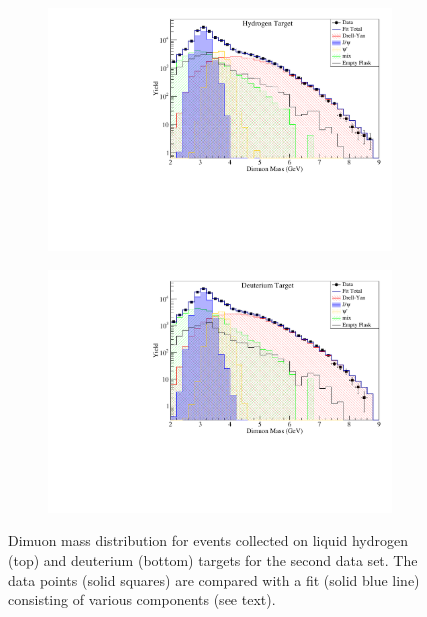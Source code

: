 \documentclass[reprint,aps,unsortedaddress,superscriptaddress,prc,floatfix,showpacs,linenumbers]{revtex4-2}
\begin{document}
\begin{figure}[htbp!]
	\centering
	\begin{subfigure}{\linewidth}
		\includegraphics[width=\linewidth]{massfit_run56_LH2.pdf}
	\end{subfigure}
	\begin{subfigure}{\linewidth}
		\includegraphics[width=\linewidth]{massfit_run56_LD2.pdf}
	\end{subfigure}
	\caption{Dimuon mass distribution for events collected
		on liquid hydrogen (top) and deuterium (bottom) targets for the second data set.
		The data points (solid squares) are compared with a fit (solid blue line) consisting of
		various components (see text).}
	\label{fig:massfit}
\end{figure}
\end{document}
